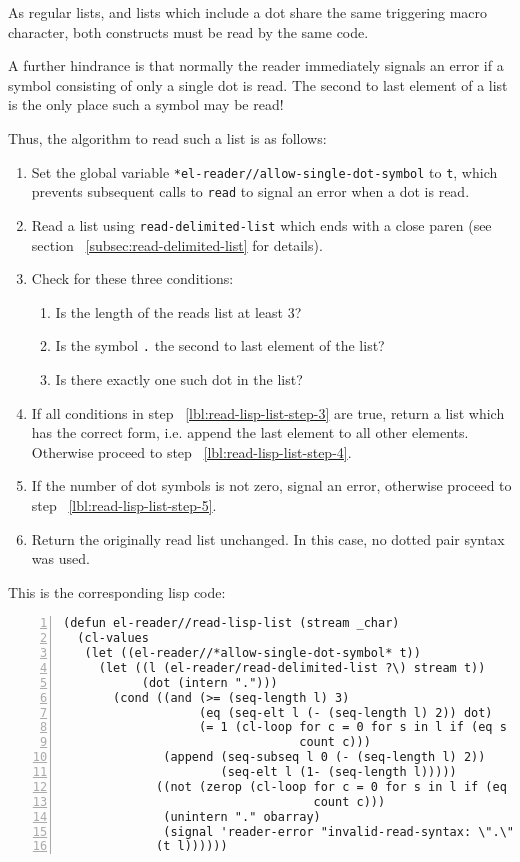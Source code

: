 \documentclass[a4paper,10pt,twoside]{report}
\newcommand{\sym}[1]{\texttt{#1}}
\newcommand{\fun}[1]{\texttt{#1}}
\newcommand{\Read}{\fun{read}}
\begin{document}
As regular lists, and lists which include a dot share the same triggering macro
character, both constructs must be read by the same code.

A further hindrance is that normally the reader immediately signals an error if
a symbol consisting of only a single dot is read.  The second to last element of
a list is the only place such a symbol may be read!

Thus, the algorithm to read such a list is as follows:

\begin{enumerate}
\item Set the global variable \sym{*el-reader//allow-single-dot-symbol} to
  \sym{t}, which prevents subsequent calls to \Read{} to signal an error when
  a dot is read.
\item Read a list using \fun{read-delimited-list} which ends with a
  close paren (see section ~\ref{subsec:read-delimited-list} for details).
\item \label{lbl:read-lisp-list-step-3}
  Check for these three conditions:
  \begin{enumerate}
  \item Is the length of the reads list at least 3?
  \item Is the symbol \sym{.} the second to last element of the list?
  \item Is there exactly one such dot in the list?
  \end{enumerate}
\item If all conditions in step ~\ref{lbl:read-lisp-list-step-3} are true, return
  a list which has the correct form, i.e. append the last element to all other
  elements.  Otherwise proceed to step ~\ref{lbl:read-lisp-list-step-4}.
\item \label{lbl:read-lisp-list-step-4}
  If the number of dot symbols is not zero, signal an error, otherwise proceed
  to step ~\ref{lbl:read-lisp-list-step-5}.
\item \label{lbl:read-lisp-list-step-5}
  Return the originally read list unchanged.  In this case, no dotted pair
  syntax was used.
\end{enumerate}

This is the corresponding lisp code:
\begin{lstlisting}[style=lispcode,label={code:read-lisp-list},caption={Code for
    \fun{el-reader//read-lisp-list}},numbers=left]
(defun el-reader//read-lisp-list (stream _char)
  (cl-values
   (let ((el-reader//*allow-single-dot-symbol* t))
     (let ((l (el-reader/read-delimited-list ?\) stream t))
           (dot (intern ".")))
       (cond ((and (>= (seq-length l) 3)
                   (eq (seq-elt l (- (seq-length l) 2)) dot)
                   (= 1 (cl-loop for c = 0 for s in l if (eq s dot)
                                 count c)))
              (append (seq-subseq l 0 (- (seq-length l) 2))
                      (seq-elt l (1- (seq-length l)))))
             ((not (zerop (cl-loop for c = 0 for s in l if (eq s dot)
                                   count c)))
              (unintern "." obarray)
              (signal 'reader-error "invalid-read-syntax: \".\""))
             (t l))))))
\end{lstlisting}
\end{document}
